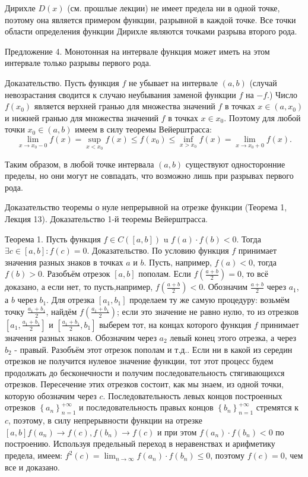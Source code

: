 Дирихле $D(x)$ (см. прошлые лекции) не имеет предела ни в одной точке, поэтому она является примером функции, разрывной в каждой точке. Все точки области определения функции Дирихле являются точками разрыва второго рода.

Предложение 4. Монотонная на интервале функция может иметь на этом интервале только разрывы первого рода.

Доказательство. Пусть функция $f$ не убывает на интервале $(a, b)$ (случай невозрастания сводится к случаю неубывания заменой функции $f$ на $-f$.) Число $f\left(x_0\right)$ является верхней гранью для множества значений $f$ в точках $x \in\left(a, x_0\right)$ и нижней гранью для множества значений $f$ в точках $x \in x_0$. Поэтому для любой точки $x_0 \in(a, b)$ имеем в силу теоремы Вейерштрасса:
$$
\lim _{x \rightarrow x_0-0} f(x)=\sup _{x<x_0} f(x) \leq f\left(x_0\right) \leq \inf _{x>x_0} f(x)=\lim _{x \rightarrow x_0+0} f(x) .
$$

Таким образом, в любой точке интервала $(a, b)$ существуют односторонние пределы, но они могут не совпадать, что возможно лишь при разрывах первого рода.

\newpage
\begin{problem}
Доказательство теоремы о нуле непрерывной на отрезке функции (Теорема 1, Лекция
13). Доказательство 1-й теоремы Вейерштрасса.
\end{problem}
Теорема 1. Пусть функция $f \in C([a, b])$ u $f(a) \cdot f(b)<0$. Тогда $\exists c \in[a, b]: f(c)=0$.
Доказательство. По условию функция $f$ принимает значения разных знаков в точках $a$ и $b$. Пусть, например, $f(a)<0$, тогда $f(b)>0$. Разобъём отрезок $[a, b]$ пополам. Если $f\left(\frac{a+b}{2}\right)=0$, то всё доказано, а если нет, то пусть,например, $f\left(\frac{a+b}{2}\right)<0$. Обозначим $\frac{a+b}{2}$ через $a_1$, а $b$ через $b_1$. Для отрезка $\left[a_1, b_1\right]$ проделаем ту же самую процедуру: возьмём точку $\frac{a_1+b_1}{2}$, найдём $f\left(\frac{a_1+b_1}{2}\right)$; если это значение не равно нулю, то из отрезков $\left[a_1, \frac{a_1+b_1}{2}\right]$ и $\left[\frac{a_1+b_1}{2}, b_1\right]$ выберем тот, на концах которого функция $f$ принимает значения разных знаков. Обозначим через $a_2$ левый конец этого отрезка, а через $b_2$ - правый. Разобъём этот отрезок пополам и т.д.. Если ни в какой из середин отрезков не получится нулевое значение функции, тот этот процесс будем продолжать до бесконечности и получим последовательность стягивающихся отрезков. Пересечение этих отрезков состоит, как мы знаем, из одной точки, которую обозначим через $c$. Последовательность левых концов построенных отрезков $\left\{a_n\right\}_{n=1}^{+\infty}$ и последовательность правых концов $\left\{b_n\right\}_{n=1}^{+\infty}$ стремятся к $c$, поэтому, в силу непрерывности функции на отрезке $[a, b] f\left(a_n\right) \rightarrow f(c), f\left(b_n\right) \rightarrow f(c)$ и при этом $f\left(a_n\right) \cdot f\left(b_n\right)<0$ по построению. Используя предельный переход в неравенствах и арифметику предела, имеем: $f^2(c)=\lim _{n \rightarrow \infty} f\left(a_n\right) \cdot f\left(b_n\right) \leq 0$, поэтому $f(c)=0$, чем все и доказано.

